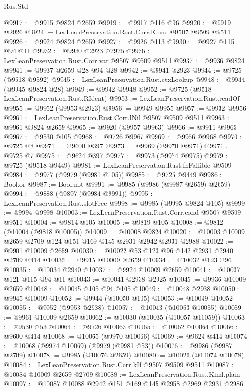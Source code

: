 \begin{lexlean}{RustStd}
\begin{coremodule}
@9917 := @9915 @9824 @2659
@9919 := @9917 @116 @96
@9920 := @9919 @2926
@9924 := LexLeanPreservation.Rust.Corr.lCons @9507 @9509 @9511
@9926 := @9924 @9824 @2659
@9927 := @9926 @113
@9930 := @9927 @115 @94 @11
@9932 := @9930 @2923 @2925
@9936 := LexLeanPreservation.Rust.Corr.var @9507 @9509 @9511
@9937 := @9936 @9824
@9941 := @9937 @2659 @28 @94 @28
@9942 := @9941 @2923
@9944 := @9725 (@9518 @9592)
@9945 := LexLeanPreservation.Rust.ctxLookup
@9948 := @9944 (@9945 @9824 @28)
@9949 := @9942 @9948
@9952 := @9725 (@9518 LexLeanPreservation.Rust.RIdent)
@9953 := LexLeanPreservation.Rust.readOf
@9955 := @9952 (@9953 @2923)
@9956 := @9949 @9955
@9957 := @9932 @9956
@9961 := LexLeanPreservation.Rust.Corr.lNil @9507 @9509 @9511
@9963 := @9961 @9824 @2659
@9965 := @9920 (@9957 @9963)
@9966 := @9911 @9965
@9967 := @9530 @105
@9968 := @9726 @9967
@9969 := @9966 @9968
@9970 := @9725 @8
@9971 := @9600 @397
@9973 := @9969 (@9970 @9971)
@9974 := @9725 @7
@9975 := @9624 @397
@9977 := @9973 (@9974 @9975)
@9979 := @9725 (@9518 @9449)
@9981 := LexLeanPreservation.Rust.fnFallible @9509
@9984 := @9977 (@9979 (@9981 @105))
@9985 := @9725 @9449
@9986 := Bool.or
@9987 := Bool.not
@9991 := @9985 (@9986 (@9987 @2659) @2659)
@9994 := @9888 (@9897 (@9984 @9991))
@9995 := LexLeanPreservation.Rust.slotFree
@9998 := @9985 (@9995 @9824 @105)
@9999 := @9994 @9998
@10003 := LexLeanPreservation.Rust.Corr.cond @9507 @9509 @9511
@10004 := @9814 @105
@10005 := @9819 @105
@10008 := @9812 (@10004 (@9818 @10005))
@10009 := @10008 @9824
@10020 := @10003 @10009 @2659 @2709 @124 @151 @169 @145 @2931 @2942 @2931 @2988
@10022 := @9901 @10009 @2659
@10030 := @10022 @53 @123 @96 @142 @2931 @2940 @2709 @414
@10032 := @9915 @10009 @2659
@10034 := @10032 @123 @96
@10035 := @10034 @2940
@10037 := @9924 @10009 @2659
@10041 := @10037 @121 @115 @94 @11
@10043 := @10041 @2938 @2925
@10045 := @9936 @10009 @2659
@10048 := @10045 @105 @94 @105
@10049 := @10048 @2938
@10050 := @9945 @10009
@10052 := @9944 (@10050 @105)
@10053 := @10049 @10052
@10055 := @9952 (@9953 @2938)
@10057 := @10043 (@10053 @10055)
@10059 := @9961 @10009 @2659
@10062 := @10030 (@10035 (@10057 @10059))
@10063 := @9530 @53
@10064 := @9726 @10063
@10065 := @10062 @10064
@10066 := @9600 @414
@10068 := @10065 (@9970 @10066)
@10069 := @9624 @414
@10074 := @10068 (@9974 @10069) (@9979 (@9981 @53))
@10076 := @9986 (@9987 @2709)
@10078 := @9985 (@10076 @2659)
@10080 := @10020 (@10074 @10078)
@10084 := LexLeanPreservation.Rust.Corr.kIf @9507 @9509 @9511
@10087 := @10084 @10009 @2659 @2709
@10088 := LexLeanPreservation.Rust.Kind.plain
@10097 := @10087 @10088 @2942 @151 @169 @145 @2958 @2969 @2931 @2986

\end{coremodule}
\end{lexlean}
